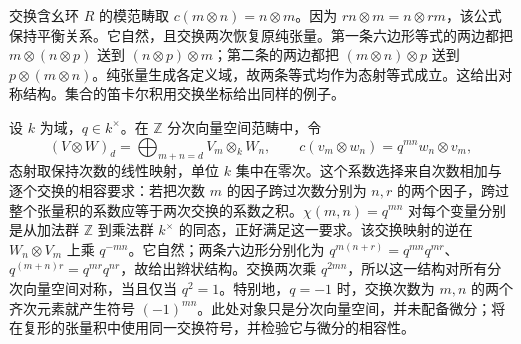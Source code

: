\begin{example}\label{b4:exm:symmetric-module-tensor}
	交换含幺环 \(R\) 的模范畴取 \(c(m\otimes n)=n\otimes m\)。因为 \(rn\otimes m=n\otimes rm\)，该公式保持平衡关系。它自然，且交换两次恢复原纯张量。第一条六边形等式的两边都把 \(m\otimes(n\otimes p)\) 送到 \((n\otimes p)\otimes m\)；第二条的两边都把 \((m\otimes n)\otimes p\) 送到 \(p\otimes(m\otimes n)\)。纯张量生成各定义域，故两条等式均作为态射等式成立。这给出对称结构。集合的笛卡尔积用交换坐标给出同样的例子。
\end{example}

\begin{example}\label{b4:exm:graded-braiding}
	设 \(k\) 为域，\(q\in k^\times\)。在 \(\mathbb Z\) 分次向量空间范畴中，令
	\[
		(V\otimes W)_d=\bigoplus_{m+n=d}V_m\otimes_kW_n, \qquad c(v_m\otimes w_n)=q^{mn}w_n\otimes v_m,
	\]
	态射取保持次数的线性映射，单位 \(k\) 集中在零次。这个系数选择来自次数相加与逐个交换的相容要求：若把次数 \(m\) 的因子跨过次数分别为 \(n,r\) 的两个因子，跨过整个张量积的系数应等于两次交换的系数之积。\(\chi(m,n)=q^{mn}\) 对每个变量分别是从加法群 \(\mathbb Z\) 到乘法群 \(k^\times\) 的同态，正好满足这一要求。该交换映射的逆在 \(W_n\otimes V_m\) 上乘 \(q^{-mn}\)。它自然；两条六边形分别化为 \(q^{m(n+r)}=q^{mn}q^{mr}\)、\(q^{(m+n)r}=q^{mr}q^{nr}\)，故给出辫状结构。交换两次乘 \(q^{2mn}\)，所以这一结构对所有分次向量空间对称，当且仅当 \(q^2=1\)。特别地，\(q=-1\) 时，交换次数为 \(m,n\) 的两个齐次元素就产生符号 \((-1)^{mn}\)。此处对象只是分次向量空间，并未配备微分；将在复形的张量积中使用同一交换符号，并检验它与微分的相容性。
\end{example}
